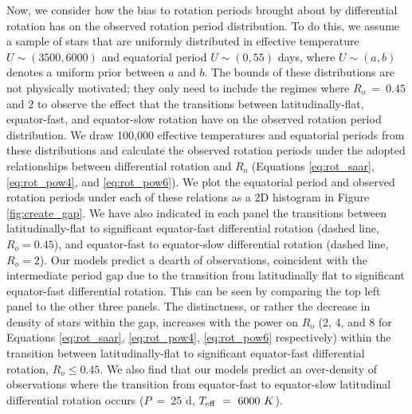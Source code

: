 Now, we consider how the bias to rotation periods brought about by differential rotation has on the observed rotation period distribution.
To do this, we assume a sample of stars that are uniformly distributed in effective temperature $U\sim\left(3500,6000\right)$ and equatorial period $U\sim\left(0,55\right)$ days, where ${U}\sim \left(a,b\right)$ denotes a uniform prior between $a$ and $b$.
The bounds of these distributions are not physically motivated; they only need to include the regimes where $R_o \ = \ 0.45$ and $2$ to observe the effect that the transitions between latitudinally-flat, equator-fast, and equator-slow rotation have on the observed rotation period distribution.
We draw 100,000 effective temperatures and equatorial periods from these distributions and calculate the observed rotation periods under the adopted relationships between differential rotation and $R_o$ (Equations \ref{eq:rot_saar}, \ref{eq:rot_pow4}, and \ref{eq:rot_pow6}).
We plot the equatorial period and observed rotation periods under each of these relations as a 2D histogram in Figure \ref{fig:create_gap}.
We have also indicated in each panel the transitions between latitudinally-flat to significant equator-fast differential rotation (dashed line, $R_o = 0.45$), and equator-fast to equator-slow differential rotation (dashed line, $R_o = 2$).
Our models predict a dearth of observations, coincident with the intermediate period gap due to the transition from latitudinally flat to significant equator-fast differential rotation.
This can be seen by comparing the top left panel to the other three panels.
The distinctness, or rather the decrease in density of stars within the gap, increases with the power on $R_o$ (2, 4, and 8 for Equations \ref{eq:rot_saar}, \ref{eq:rot_pow4}, \ref{eq:rot_pow6} respectively) within the transition between latitudinally-flat to significant equator-fast differential rotation, $R_o \leq 0.45$.
We also find that our models predict an over-density of observations where the transition from equator-fast to equator-slow latitudinal differential rotation occurs ($P \ = \ 25$ d, $T_{\rm{eff}} \ = \ 6000 \ K$).

